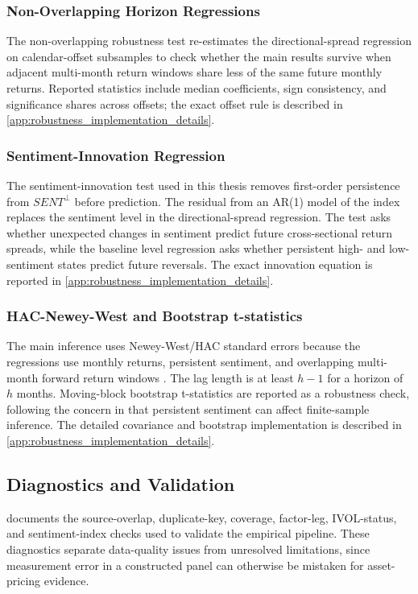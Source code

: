 \documentclass[11pt]{article}
\newcommand{\var}[1]{\ensuremath{#1}}
\begin{document}
\subsubsection{Non-Overlapping Horizon Regressions}
The non-overlapping robustness test re-estimates the directional-spread regression on calendar-offset subsamples to check whether the main results survive when adjacent multi-month return windows share less of the same future monthly returns. Reported statistics include median coefficients, sign consistency, and significance shares across offsets; the exact offset rule is described in \cref{app:robustness_implementation_details}.

\subsubsection{Sentiment-Innovation Regression}
The sentiment-innovation test used in this thesis removes first-order persistence from \var{SENT^{\perp}} before prediction. The residual from an AR(1) model of the index replaces the sentiment level in the directional-spread regression. The test asks whether unexpected changes in sentiment predict future cross-sectional return spreads, while the baseline level regression asks whether persistent high- and low-sentiment states predict future reversals. The exact innovation equation is reported in \cref{app:robustness_implementation_details}.

\subsubsection{HAC-Newey-West and Bootstrap t-statistics}
The main inference uses Newey-West/HAC standard errors because the regressions use monthly returns, persistent sentiment, and overlapping multi-month forward return windows \citep{newey1987simple}. The lag length is at least \var{h-1} for a horizon of \var{h} months. Moving-block bootstrap t-statistics are reported as a robustness check, following the concern in \citet{baker2006sentiment} that persistent sentiment can affect finite-sample inference. The detailed covariance and bootstrap implementation is described in \cref{app:robustness_implementation_details}.

\subsection{Diagnostics and Validation}
 documents the source-overlap, duplicate-key, coverage, factor-leg, IVOL-status, and sentiment-index checks used to validate the empirical pipeline. These diagnostics separate data-quality issues from unresolved limitations, since measurement error in a constructed panel can otherwise be mistaken for asset-pricing evidence.
\end{document}
